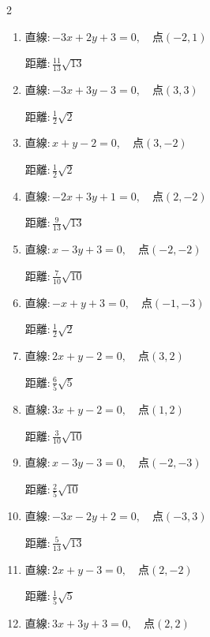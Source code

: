 \begin{multicols}{2}
\begin{enumerate}
        $\displaystyle 距離 : \frac{3}{4}\sqrt{2}$

  \item $直線:-3x+2y+3=0,\quad 点 ( -2, 1 )$

        $\displaystyle 距離 : \frac{11}{13}\sqrt{13}$

  \item $直線:-3x+3y-3=0,\quad 点 ( 3, 3 )$

        $\displaystyle 距離 : \frac{1}{2}\sqrt{2}$

  \item $直線:x+y-2=0,\quad 点 ( 3, -2 )$

        $\displaystyle 距離 : \frac{1}{2}\sqrt{2}$

  \item $直線:-2x+3y+1=0,\quad 点 ( 2, -2 )$

        $\displaystyle 距離 : \frac{9}{13}\sqrt{13}$

  \item $直線:x-3y+3=0,\quad 点 ( -2, -2 )$

        $\displaystyle 距離 : \frac{7}{10}\sqrt{10}$

  \item $直線:-x+y+3=0,\quad 点 ( -1, -3 )$

        $\displaystyle 距離 : \frac{1}{2}\sqrt{2}$

\columnbreak %

\resetques

  \item $直線:2x+y-2=0,\quad 点 ( 3, 2 )$

        $\displaystyle 距離 : \frac{6}{5}\sqrt{5}$

  \item $直線:3x+y-2=0,\quad 点 ( 1, 2 )$

        $\displaystyle 距離 : \frac{3}{10}\sqrt{10}$

  \item $直線:x-3y-3=0,\quad 点 ( -2, -3 )$

        $\displaystyle 距離 : \frac{2}{5}\sqrt{10}$

  \item $直線:-3x-2y+2=0,\quad 点 ( -3, 3 )$

        $\displaystyle 距離 : \frac{5}{13}\sqrt{13}$

  \item $直線:2x+y-3=0,\quad 点 ( 2, -2 )$

        $\displaystyle 距離 : \frac{1}{5}\sqrt{5}$

  \item $直線:3x+3y+3=0,\quad 点 ( 2, 2 )$


\end{enumerate}
\end{multicols}
